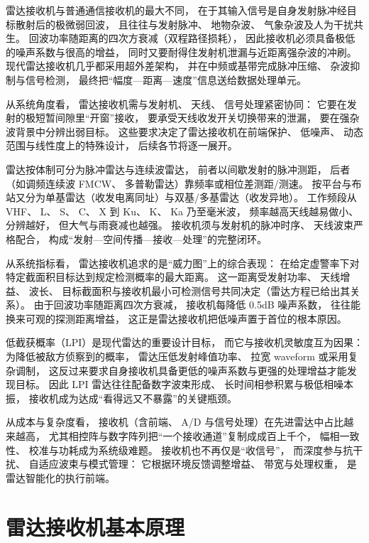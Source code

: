 雷达接收机与普通通信接收机的最大不同，
在于其输入信号是自身发射脉冲经目标散射后的极微弱回波，
且往往与发射脉冲、
地物杂波、
气象杂波及人为干扰共生。
回波功率随距离的四次方衰减（双程路径损耗），
因此接收机必须具备极低的噪声系数与很高的增益，
同时又要耐得住发射机泄漏与近距离强杂波的冲刷。
现代雷达接收机几乎都采用超外差架构，
并在中频或基带完成脉冲压缩、
杂波抑制与信号检测，
最终把“幅度—距离—速度”信息送给数据处理单元。

从系统角度看，
雷达接收机需与发射机、
天线、
信号处理紧密协同：
它要在发射的极短暂间隙里“开窗”接收，
要承受天线收发开关切换带来的泄漏，
要在强杂波背景中分辨出弱目标。
这些要求决定了雷达接收机在前端保护、
低噪声、
动态范围与线性度上的特殊设计，
后续各节将逐一展开。

雷达按体制可分为脉冲雷达与连续波雷达，
前者以间歇发射的脉冲测距，
后者（如调频连续波 FMCW、
多普勒雷达）靠频率或相位差测距/测速。
按平台与布站又分为单基雷达（收发电离同址）与双基/多基雷达（收发异地）。
工作频段从 VHF、
L、
S、
C、
X 到 Ku、
K、
Ka 乃至毫米波，
频率越高天线越易做小、
分辨越好，
但大气与雨衰减也越强。
接收机须与发射机的脉冲时序、
天线波束严格配合，
构成“发射—空间传播—接收—处理”的完整闭环。

从系统指标看，
雷达接收机追求的是“威力图”上的综合表现：
在给定虚警率下对特定截面积目标达到规定检测概率的最大距离。
这一距离受发射功率、
天线增益、
波长、
目标截面积与接收机最小可检测信号共同决定（雷达方程已给出其关系）。
由于回波功率随距离四次方衰减，
接收机每降低 0.5dB 噪声系数，
往往能换来可观的探测距离增益，
这正是雷达接收机把低噪声置于首位的根本原因。

低截获概率（LPI）是现代雷达的重要设计目标，
而它与接收机灵敏度互为因果：
为降低被敌方侦察到的概率，
雷达压低发射峰值功率、
拉宽 waveform 或采用复杂调制，
这反过来要求自身接收机具备更低的噪声系数与更强的处理增益才能发现目标。
因此 LPI 雷达往往配备数字波束形成、
长时间相参积累与极低相噪本振，
接收机成为达成“看得远又不暴露”的关键瓶颈。

从成本与复杂度看，
接收机（含前端、
A/D 与信号处理）在先进雷达中占比越来越高，
尤其相控阵与数字阵列把“一个接收通道”复制成成百上千个，
幅相一致性、
校准与功耗成为系统级难题。
接收机也不再仅是“收信号”，
而深度参与抗干扰、
自适应波束与模式管理：
它根据环境反馈调整增益、
带宽与处理权重，
是雷达智能化的执行前端。

\section{雷达接收机基本原理}
\label{sec:radar_principle}

